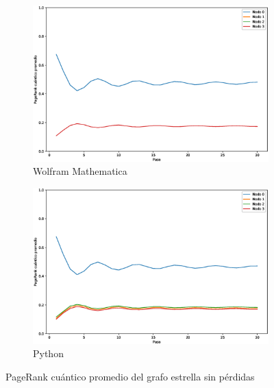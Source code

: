 \documentclass[xetex,mathserif,serif]{beamer}
\begin{document}
\begin{frame}
\begin{figure}[H]
    \centering
    \begin{subfigure}[m]{0.45\textwidth}
        \centering
        \includegraphics[width=0.9\linewidth]{img/star-mean-M.eps}
        \caption{Wolfram Mathematica}
    \end{subfigure}
    \begin{subfigure}[m]{0.45\textwidth}
        \centering
        \includegraphics[width=0.9\linewidth]{img/star-mean-lossless.eps}
        \caption{Python}
    \end{subfigure}
    \caption[PageRank cuántico promedio del grafo estrella sin pérdidas]{PageRank cuántico promedio del grafo estrella sin pérdidas}
    \label{fig:meanstarlossless}
\end{figure}


\end{frame}
\end{document}
